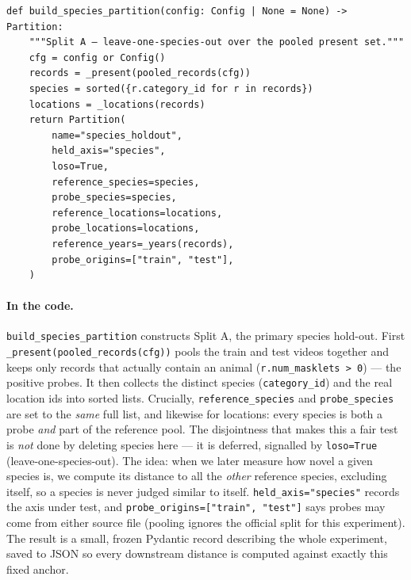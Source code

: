\documentclass[11pt,a4paper]{article}
\newcommand{\code}[1]{\texttt{#1}}
\newcommand{\srcfile}[1]{\smallskip\noindent{\footnotesize\color{navy}\ttfamily\textbf{#1}}\par\nobreak\vspace{-0.15em}}
\begin{document}
\srcfile{src/splits.py}
\begin{lstlisting}[style=py]
def build_species_partition(config: Config | None = None) -> Partition:
    """Split A — leave-one-species-out over the pooled present set."""
    cfg = config or Config()
    records = _present(pooled_records(cfg))
    species = sorted({r.category_id for r in records})
    locations = _locations(records)
    return Partition(
        name="species_holdout",
        held_axis="species",
        loso=True,
        reference_species=species,
        probe_species=species,
        reference_locations=locations,
        probe_locations=locations,
        reference_years=_years(records),
        probe_origins=["train", "test"],
    )
\end{lstlisting}

\paragraph{In the code.}
\code{build\_species\_partition} constructs Split A, the primary species hold-out. First
\code{\_present(pooled\_records(cfg))} pools the train and test videos together and keeps only records that
actually contain an animal (\code{r.num\_masklets > 0}) --- the positive probes. It then collects the
distinct species (\code{category\_id}) and the real location ids into sorted lists. Crucially,
\code{reference\_species} and \code{probe\_species} are set to the \emph{same} full list, and likewise for
locations: every species is both a probe \emph{and} part of the reference pool. The disjointness that makes
this a fair test is \emph{not} done by deleting species here --- it is deferred, signalled by
\code{loso=True} (leave-one-species-out). The idea: when we later measure how novel a given species is, we
compute its distance to all the \emph{other} reference species, excluding itself, so a species is never
judged similar to itself. \code{held\_axis="species"} records the axis under test, and
\code{probe\_origins=["train", "test"]} says probes may come from either source file (pooling ignores the
official split for this experiment). The result is a small, frozen Pydantic record describing the whole
experiment, saved to JSON so every downstream distance is computed against exactly this fixed anchor.
\end{document}
